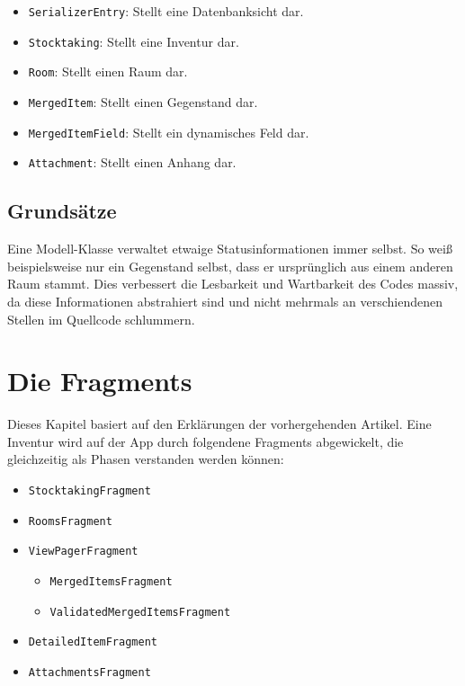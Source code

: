 \begin{itemize}
\tightlist
\item
  \texttt{SerializerEntry}: Stellt eine Datenbanksicht dar.
\item
  \texttt{Stocktaking}: Stellt eine Inventur dar.
\item
  \texttt{Room}: Stellt einen Raum dar.
\item
  \texttt{MergedItem}: Stellt einen Gegenstand dar.
\item
  \texttt{MergedItemField}: Stellt ein dynamisches Feld dar.
\item
  \texttt{Attachment}: Stellt einen Anhang dar.
\end{itemize}

\hypertarget{grundsuxe4tze}{%
\subsection{Grundsätze}\label{grundsuxe4tze}}

Eine Modell-Klasse verwaltet etwaige Statusinformationen immer selbst.
So weiß beispielsweise nur ein Gegenstand selbst, dass er ursprünglich
aus einem anderen Raum stammt. Dies verbessert die Lesbarkeit und
Wartbarkeit des Codes massiv, da diese Informationen abstrahiert sind
und nicht mehrmals an verschiendenen Stellen im Quellcode schlummern.

\hypertarget{die-fragments}{%
\section{Die Fragments}\label{die-fragments}}

Dieses Kapitel basiert auf den Erklärungen der vorhergehenden Artikel.
Eine Inventur wird auf der App durch folgendene Fragments abgewickelt,
die gleichzeitig als Phasen verstanden werden können:

\begin{itemize}
\tightlist
\item
  \texttt{StocktakingFragment}
\item
  \texttt{RoomsFragment}
\item
  \texttt{ViewPagerFragment}

  \begin{itemize}
  \tightlist
  \item
    \texttt{MergedItemsFragment}
  \item
    \texttt{ValidatedMergedItemsFragment}
  \end{itemize}
\item
  \texttt{DetailedItemFragment}
\item
  \texttt{AttachmentsFragment}
\end{itemize}

